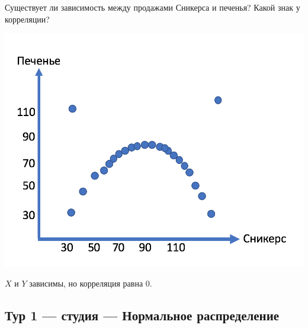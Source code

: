 \begin{enumerate}
\begin{problem}
Существует ли зависимость между продажами Сникерса и печенья? Какой знак у корреляции? 

\includegraphics[scale=0.5]{images/No_correlation}

\begin{sol}
$X$ и $Y$ зависимы, но корреляция равна $0$.
\end{sol}
\end{problem}
\end{enumerate}


\newpage
\subsection{Тур 1 — студия — Нормальное распределение}

